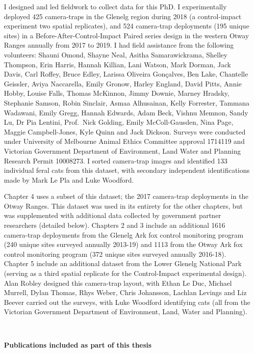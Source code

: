 \documentclass[11pt,a4paper,titlepage,twoside,openright]{style/unimelbthesis}
\begin{document}
\begin{frontmatter}
\begin{preface}
    I designed and led fieldwork to collect data for this PhD. I experimentally deployed 425 camera-traps in the Glenelg region during 2018 (a control-impact experiment two spatial replicates), and 524 camera-trap deployments (195 unique sites) in a Before-After-Control-Impact Paired series design in the western Otway Ranges annually from 2017 to 2019. I had field assistance from the following volunteers: Shauni Omond, Shayne Neal, Asitha Samarawickrama, Shelley Thompson, Erin Harris, Hannah Killian, Lani Watson, Mark Dorman, Jack Davis, Carl Roffey, Bruce Edley, Larissa Oliveira Gonçalves, Ben Lake, Chantelle Geissler, Aviya Naccarella, Emily Gronow, Harley England, David Pitts, Annie Hobby, Louise Falls, Thomas McKinnon, Jimmy Downie, Marney Hradsky, Stephanie Samson, Robin Sinclair, Asmaa Alhusainan, Kelly Forrester, Tammana Wadawani, Emily Gregg, Hannah Edwards, Adam Beck, Vishnu Memnon, Sandy Lu, Dr Pia Lentini, Prof.~Nick Golding, Emily McColl-Gausden, Nina Page, Maggie Campbell-Jones, Kyle Quinn and Jack Dickson. Surveys were conducted under University of Melbourne Animal Ethics Committee approval 1714119 and Victorian Government Department of Environment, Land Water and Planning Research Permit 10008273. I sorted camera-trap images and identified 133 individual feral cats from this dataset, with secondary independent identifications made by Mark Le Pla and Luke Woodford.
    
    Chapter 4 uses a subset of this dataset; the 2017 camera-trap deployments in the Otway Ranges. This dataset was used in its entirety for the other chapters, but was supplemented with additional data collected by government partner researchers (detailed below). Chapters 2 and 3 include an additional 1616 camera-trap deployments from the Glenelg Ark fox control monitoring program (240 unique sites surveyed annually 2013-19) and 1113 from the Otway Ark fox control monitoring program (372 unique sites surveyed annually 2016-18). Chapter 5 include an additional dataset from the Lower Glenelg National Park (serving as a third spatial replicate for the Control-Impact experimental design). Alan Robley designed this camera-trap layout, with Ethan Le Duc, Michael Murrell, Dylan Thomas, Rhys Weber, Chris Johansson, Lachlan Levings and Liz Beever carried out the surveys, with Luke Woodford identifying cats (all from the Victorian Government Department of Environment, Land, Water and Planning).
    
    \(~\)
    
    \textbf{Publications included as part of this thesis}
    

\end{preface}
\end{frontmatter}
\end{document}
